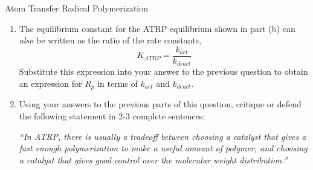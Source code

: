 \begin{activity}{Atom Transfer Radical Polymerization}
\begin{exercises}
\begin{enumerate}
			\item The equilibrium constant for the ATRP equilibrium shown in part (b) can \emph{also} be written as the ratio of the rate constants,
				\begin{equation*}
					K_{ATRP} = \frac{k_{act}}{k_{deact}}
				\end{equation*}
				Substitute this expression into your answer to the previous question to obtain an expression for $R_p$ in terms of $k_{act}$ and $k_{deact}$.
		
		\begin{solution}\end{solution}
				
			\item Using your answers to the previous parts of this question, critique or defend the following statement in 2-3 complete sentences:
			
				\emph{``In ATRP, there is usually a tradeoff between choosing a catalyst that gives a fast enough polymerization to make a useful amount of polymer, and choosing a catalyst that gives good control over the molecular weight distribution.''}
		
		\begin{solution}\end{solution}
		
		\end{enumerate}
	
\end{exercises}


%
%	


	
\end{activity}